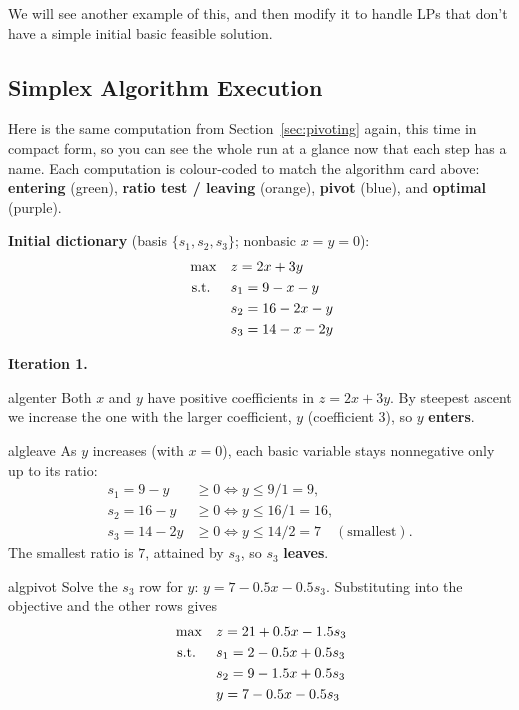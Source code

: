 We will see another example of this, and then modify it to handle LPs that don't have a simple initial basic feasible solution.

\subsection{Simplex Algorithm Execution}

Here is the same computation from Section~\ref{sec:pivoting} again, this time in compact form, so you can see the whole run at a glance now that each step has a name. Each computation is colour-coded to match the algorithm card above: {\color{algenter}\textbf{entering}} (green), {\color{algleave}\textbf{ratio test / leaving}} (orange), {\color{algpivot}\textbf{pivot}} (blue), and {\color{algopt}\textbf{optimal}} (purple).

\noindent\textbf{Initial dictionary} (basis \(\{s_1,s_2,s_3\}\); nonbasic \(x=y=0\)):
\[
\begin{aligned}
\max\quad & z = 2x + 3y \\
\mbox{ s.t. }\quad  & s_1 = 9 - x - y \\
          & s_2 = 16 - 2x - y \\
          & s_3 = 14 - x - 2y
\end{aligned}
\]

\noindent\textbf{Iteration 1.}
\begin{steppanel}{algenter}
 Both \(x\) and \(y\) have positive coefficients in \(z = 2x + 3y\). By steepest ascent we increase the one with the larger coefficient, \(y\) (coefficient \(3\)), so \(y\) \textbf{enters}.
\end{steppanel}
\begin{steppanel}{algleave}
 As \(y\) increases (with \(x=0\)), each basic variable stays nonnegative only up to its ratio:
\[
\begin{aligned}
s_1 = 9 - y   &\ge 0 \iff y \le 9/1  = 9,\\
s_2 = 16 - y  &\ge 0 \iff y \le 16/1 = 16,\\
s_3 = 14 - 2y &\ge 0 \iff y \le 14/2 = 7 \quad(\text{smallest}).
\end{aligned}
\]
The smallest ratio is \(7\), attained by \(s_3\), so \(s_3\) \textbf{leaves}.
\end{steppanel}
\begin{steppanel}{algpivot}
 Solve the \(s_3\) row for \(y\): \(y = 7 - 0.5x - 0.5s_3\). Substituting into the objective and the other rows gives
\[
\begin{aligned}
\max\quad & z = 21 + 0.5x - 1.5s_3 \\
\mbox{ s.t. }\quad  & s_1 = 2 - 0.5x + 0.5s_3 \\
          & s_2 = 9 - 1.5x + 0.5s_3 \\
          & y = 7 - 0.5x - 0.5s_3
\end{aligned}
\]
\end{steppanel}

